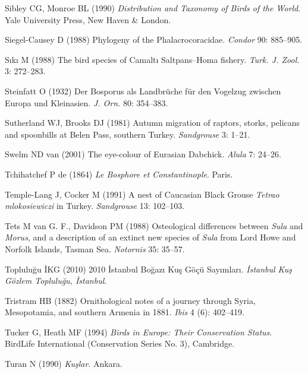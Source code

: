 \documentclass[
  letterpaper,
  DIV=11,
  numbers=noendperiod]{scrreprt}
\newlength{\cslhangindent}
\newenvironment{CSLReferences}[2] %
 {\begin{list}{}{%
  \setlength{\itemindent}{0pt}
  \setlength{\leftmargin}{0pt}
  \setlength{\parsep}{0pt}
  \ifodd #1
   \setlength{\leftmargin}{\cslhangindent}
   \setlength{\itemindent}{-1\cslhangindent}
  \fi
  \setlength{\itemsep}{#2\baselineskip}}}
 {\end{list}}
\begin{document}
\begin{CSLReferences}{0}{1}
Sibley CG, Monroe BL (1990) \emph{{Distribution and Taxonomy of Birds of
the World}}. Yale University Press, New Haven \& London.

Siegel-Causey D (1988) {Phylogeny of the Phalacrocoracidae}.
\emph{Condor} 90: 885--905.

Sıkı M (1988) {The bird species of Camaltı Saltpans--Homa fishery}.
\emph{Turk. J. Zool.} 3: 272--283.

Steinfatt O (1932) {Der Bosporus als Landbrüche für den Vogelzug
zwischen Europa und Kleinasien}. \emph{J. Orn.} 80: 354--383.

Sutherland WJ, Brooks DJ (1981) {Autumn migration of raptors, storks,
pelicans and spoonbills at Belen Pass, southern Turkey}.
\emph{Sandgrouse} 3: 1--21.

Swelm ND van (2001) {The eye-colour of Eurasian Dabchick}. \emph{Alula}
7: 24--26.

Tchihatchef P de (1864) \emph{{Le Bosphore et Constantinople}}. Paris.

Temple-Lang J, Cocker M (1991) {A nest of Caucasian Black Grouse
\emph{Tetrao mlokosiewiczi} in Turkey}. \emph{Sandgrouse} 13: 102--103.

Tets M van G. F., Davidson PM (1988) {Osteological differences between
\emph{Sula} and \emph{Morus}, and a description of an extinct new
species of \emph{Sula} from Lord Howe and Norfolk Islands, Tasman Sea}.
\emph{Notornis} 35: 35--57.

Topluluğu İKG (2010) {2010 İstanbul Boğazı Kuş Göçü Sayımları}.
\emph{İstanbul Kuş Gözlem Topluluğu, İstanbul}.

Tristram HB (1882) {Ornithological notes of a journey through Syria,
Mesopotamia, and southern Armenia in 1881}. \emph{Ibis} 4 (6): 402--419.

Tucker G, Heath MF (1994) \emph{{Birds in Europe: Their Conservation
Status}}. BirdLife International (Conservation Series No. 3), Cambridge.

Turan N (1990) \emph{{Kuşlar}}. Ankara.


\end{CSLReferences}
\end{document}

